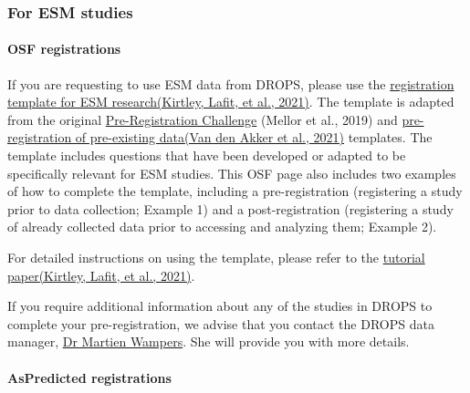 \documentclass[
]{article}
\begin{document}
\hypertarget{section-3}{%
\subsubsection{}\label{section-3}}

\hypertarget{for-esm-studies}{%
\subsubsection{For ESM studies}\label{for-esm-studies}}

\hypertarget{osf-registrations-1}{%
\paragraph{OSF registrations}\label{osf-registrations-1}}

If you are requesting to use ESM data from DROPS, please use the
\href{https://osf.io/2chmu/}{registration template for ESM
research}\href{https://www.zotero.org/google-docs/?ORGIOC}{(Kirtley,
Lafit, et al., 2021)}. The template is adapted from the original
\href{https://osf.io/x5w7h/}{Pre-Registration Challenge} (Mellor et al.,
2019) and
\href{https://open.lnu.se/index.php/metapsychology/article/view/2625}{pre-registration
of pre-existing
data}\href{https://www.zotero.org/google-docs/?EKoiMH}{(Van den Akker et
al., 2021)} templates. The template includes questions that have been
developed or adapted to be specifically relevant for ESM studies. This
OSF page also includes two examples of how to complete the template,
including a pre-registration (registering a study prior to data
collection; Example 1) and a post-registration (registering a study of
already collected data prior to accessing and analyzing them; Example
2).

For detailed instructions on using the template, please refer to the
\href{https://journals.sagepub.com/doi/abs/10.1177/2515245920924686}{tutorial
paper}\href{https://www.zotero.org/google-docs/?pBAwde}{(Kirtley, Lafit,
et al., 2021)}.

If you require additional information about any of the studies in DROPS
to complete your pre-registration, we advise that you contact the DROPS
data manager,
\href{https://www.kuleuven.be/wieiswie/en/person/00007576}{Dr Martien
Wampers}. She will provide you with more details.

\hypertarget{aspredicted-registrations-1}{%
\paragraph{AsPredicted
registrations}\label{aspredicted-registrations-1}}
\end{document}
